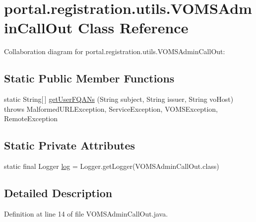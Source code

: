 \hypertarget{classportal_1_1registration_1_1utils_1_1VOMSAdminCallOut}{
\section{portal.registration.utils.VOMSAdminCallOut Class Reference}
\label{classportal_1_1registration_1_1utils_1_1VOMSAdminCallOut}
}


Collaboration diagram for portal.registration.utils.VOMSAdminCallOut:
\subsection*{Static Public Member Functions}
\begin{DoxyCompactItemize}
\item 
static String\mbox{[}$\,$\mbox{]} \hyperlink{classportal_1_1registration_1_1utils_1_1VOMSAdminCallOut_ac7248574c47f256fe524dfcb82059304}{getUserFQANs} (String subject, String issuer, String voHost)  throws MalformedURLException, ServiceException, 			VOMSException, RemoteException 
\end{DoxyCompactItemize}
\subsection*{Static Private Attributes}
\begin{DoxyCompactItemize}
\item 
static final Logger \hyperlink{classportal_1_1registration_1_1utils_1_1VOMSAdminCallOut_ab880f67d51ab1f64a091d8dff902a0be}{log} = Logger.getLogger(VOMSAdminCallOut.class)
\end{DoxyCompactItemize}


\subsection{Detailed Description}


Definition at line 14 of file VOMSAdminCallOut.java.



